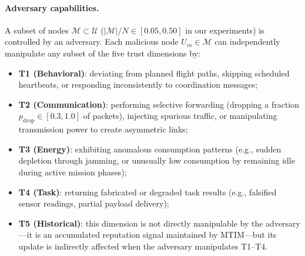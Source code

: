 \documentclass[notspecified,article,submit,moreauthors]{Definitions/mdpi}
\begin{document}
\paragraph{Adversary capabilities.}
A subset of nodes $\mathcal{M} \subset \mathcal{U}$ ($|\mathcal{M}|/N \in [0.05, 0.50]$ in our experiments) is controlled by an adversary. Each malicious node $U_m \in \mathcal{M}$ can independently manipulate any subset of the five trust dimensions by:
\begin{itemize}[topsep=0pt,itemsep=0pt]
    \item \textbf{T1 (Behavioral)}: deviating from planned flight paths, skipping scheduled heartbeats, or responding inconsistently to coordination messages;
    \item \textbf{T2 (Communication)}: performing selective forwarding (dropping a fraction $p_{\text{drop}} \in [0.3, 1.0]$ of packets), injecting spurious traffic, or manipulating transmission power to create asymmetric links;
    \item \textbf{T3 (Energy)}: exhibiting anomalous consumption patterns (e.g., sudden depletion through jamming, or unusually low consumption by remaining idle during active mission phases);
    \item \textbf{T4 (Task)}: returning fabricated or degraded task results (e.g., falsified sensor readings, partial payload delivery);
    \item \textbf{T5 (Historical)}: this dimension is not directly manipulable by the adversary---it is an accumulated reputation signal maintained by MTIM---but its update is indirectly affected when the adversary manipulates T1--T4.
\end{itemize}
\end{document}
